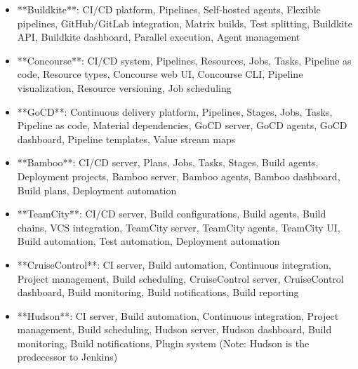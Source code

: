\documentclass[11pt,a4paper]{article}
\begin{document}
\begin{itemize}
\item **Buildkite**: CI/CD platform, Pipelines, Self-hosted agents, Flexible pipelines, GitHub/GitLab integration, Matrix builds, Test splitting, Buildkite API, Buildkite dashboard, Parallel execution, Agent management
\end{itemize}

\begin{itemize}
\item **Concourse**: CI/CD system, Pipelines, Resources, Jobs, Tasks, Pipeline as code, Resource types, Concourse web UI, Concourse CLI, Pipeline visualization, Resource versioning, Job scheduling
\end{itemize}

\begin{itemize}
\item **GoCD**: Continuous delivery platform, Pipelines, Stages, Jobs, Tasks, Pipeline as code, Material dependencies, GoCD server, GoCD agents, GoCD dashboard, Pipeline templates, Value stream maps
\end{itemize}

\begin{itemize}
\item **Bamboo**: CI/CD server, Plans, Jobs, Tasks, Stages, Build agents, Deployment projects, Bamboo server, Bamboo agents, Bamboo dashboard, Build plans, Deployment automation
\end{itemize}

\begin{itemize}
\item **TeamCity**: CI/CD server, Build configurations, Build agents, Build chains, VCS integration, TeamCity server, TeamCity agents, TeamCity UI, Build automation, Test automation, Deployment automation
\end{itemize}

\begin{itemize}
\item **CruiseControl**: CI server, Build automation, Continuous integration, Project management, Build scheduling, CruiseControl server, CruiseControl dashboard, Build monitoring, Build notifications, Build reporting
\end{itemize}

\begin{itemize}
\item **Hudson**: CI server, Build automation, Continuous integration, Project management, Build scheduling, Hudson server, Hudson dashboard, Build monitoring, Build notifications, Plugin system (Note: Hudson is the predecessor to Jenkins)
\end{itemize}
\end{document}
